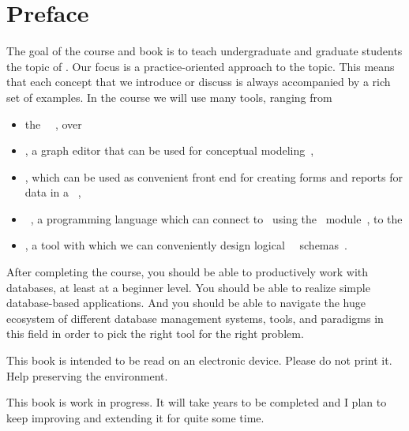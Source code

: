 \chapter*{Preface}%
%
%
The goal of the course and book is to teach undergraduate and graduate students the topic of .
Our focus is a practice-oriented approach to the topic.
This means that each concept that we introduce or discuss is always accompanied by a rich set of examples.
In the course we will use many tools, ranging from%
%
\begin{itemize}%
\item the \postgresql\ ~\cite{TA2024DDAMWPAM,FP2023LP,OH2017PUAR,B2024PELUYDW}, over%
\item \yEd, a graph editor that can be used for conceptual modeling~\cite{SG2015MDAWY,Y2011YGEM},%
\item \libreofficeBase, which can be used as convenient front end for creating forms and reports for data in a ~\cite{FNFHWSKLSSGLFRSRPLJG2022BG7R1BOL7C,S2022L7PFEUU},%
\item \python~\cite{programmingWithPython}, a programming language which can connect to \postgresql\ using the \psycopg\ module~\cite{VDGE2010P}, to the%
\item \pgmodeler, a tool with which we can conveniently design logical \postgresql\ \db\ schemas~\cite{AES2006PPDM}.%
\end{itemize}%
%
After completing the course, you should be able to productively work with databases, at least at a beginner level.
You should be able to realize simple database-based applications.
And you should be able to navigate the huge ecosystem of different database management systems, tools, and paradigms in this field in order to pick the right tool for the right problem.

This book is intended to be read on an electronic device.
Please do not print it.
Help preserving the environment.

This book is work in progress.
It will take years to be completed and I plan to keep improving and extending it for quite some time.

